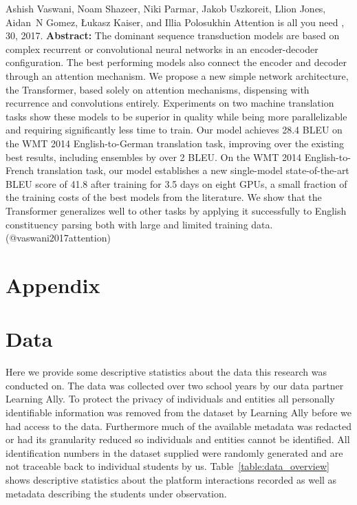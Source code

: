 \documentclass{article}
\begin{document}
\begin{thebibliography}{}
 Ashish Vaswani, Noam Shazeer, Niki Parmar, Jakob Uszkoreit, Llion Jones, Aidan~N Gomez, {\L}ukasz Kaiser, and Illia Polosukhin \newblock Attention is all you need , 30, 2017. \newblock \textbf{Abstract:} The dominant sequence transduction models are based on complex recurrent or convolutional neural networks in an encoder-decoder configuration. The best performing models also connect the encoder and decoder through an attention mechanism. We propose a new simple network architecture, the Transformer, based solely on attention mechanisms, dispensing with recurrence and convolutions entirely. Experiments on two machine translation tasks show these models to be superior in quality while being more parallelizable and requiring significantly less time to train. Our model achieves 28.4 BLEU on the WMT 2014 English-to-German translation task, improving over the existing best results, including ensembles by over 2 BLEU. On the WMT 2014 English-to-French translation task, our model establishes a new single-model state-of-the-art BLEU score of 41.8 after training for 3.5 days on eight GPUs, a small fraction of the training costs of the best models from the literature. We show that the Transformer generalizes well to other tasks by applying it successfully to English constituency parsing both with large and limited training data. \newblock (@vaswani2017attention)
\end{thebibliography}

\clearpage

\appendix
\section*{{\huge Appendix}}
\section{Data}
\FloatBarrier
Here we provide some descriptive statistics about the data this research was conducted on.  The data  was collected over two school years by our data partner Learning Ally. To protect the privacy of individuals and entities all personally identifiable information was removed from the dataset by Learning Ally before we had access to the data. Furthermore much of the available metadata was redacted or had its granularity reduced so individuals and entities cannot be identified. All identification numbers in the dataset supplied were randomly generated and are not traceable back to individual students by us. Table~\ref{table:data_overview} shows descriptive statistics about the platform interactions recorded as well as metadata describing the students under observation.
\end{document}
